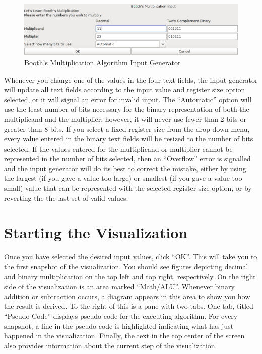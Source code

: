 \documentclass{article}
\begin{document}
\pagebreak

\begin{figure}[h]
\centering
\includegraphics[scale=0.3]{ingen.pdf}
\caption{Booth's Multiplication Algorithm Input Generator}
\end{figure}

Whenever you change one of the values in the four text fields, the input generator will update all text fields according to the input value and register size option selected, or it will signal an error for invalid input.
The ``Automatic'' option will use the least number of bits necessary for the binary representation of both the multiplicand and the multiplier; however, it will never use fewer than 2 bits or greater than 8 bits.
If you select a fixed-register size from the drop-down menu, every value entered in the binary text fields will be resized to the number of bits selected.
If the values entered for the multiplicand or multiplier cannot be represented in the number of bits selected, then an ``Overflow'' error is signalled and the input generator will do its best to correct the mistake, either by using the largest (if you gave a value too large) or smallest (if you gave a value too small) value that can be represented with the selected register size option, or by reverting the the last set of valid values.

\pagebreak
\section{Starting the Visualization}

Once you have selected the desired input values, click ``OK''.
This will take you to the first snapshot of the visualization.
You should see figures depicting decimal and binary multiplication on the top left and top right, respectively.
On the right side of the visualization is an area marked ``Math/ALU''.
Whenever binary addition or subtraction occurs, a diagram appears in this area to show you how the result is derived.
To the right of this is a pane with two tabs.
One tab, titled ``Pseudo Code'' displays pseudo code for the executing algorithm.
For every snapshot, a line in the pseudo code is highlighted indicating what has just happened in the visualization.
Finally, the text in the top center of the screen also provides information about the current step of the visualization.
\end{document}
